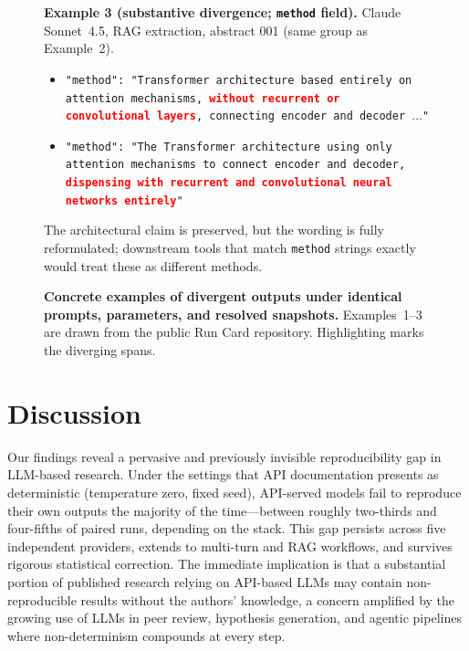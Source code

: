 \documentclass[sn-nature]{sn-jnl}
\begin{document}
\begin{figure}[t]
{\begin{minipage}{0.94\textwidth}
\medskip
\noindent\textbf{Example 3 (substantive divergence; \texttt{method} field).}
Claude Sonnet~4.5, RAG extraction, abstract 001 (same group as Example~2).
\begin{itemize}
\item[Run~A:] \texttt{"method": "Transformer architecture based entirely on attention mechanisms, \textcolor{red}{\textbf{without recurrent or convolutional layers}}, connecting encoder and decoder $\ldots$"}
\item[Run~B:] \texttt{"method": "The Transformer architecture using only attention mechanisms to connect encoder and decoder, \textcolor{red}{\textbf{dispensing with recurrent and convolutional neural networks entirely}}"}
\end{itemize}
The architectural claim is preserved, but the wording is fully reformulated; downstream tools that match \texttt{method} strings exactly would treat these as different methods.
\end{minipage}}
\caption{\textbf{Concrete examples of divergent outputs under identical prompts, parameters, and resolved snapshots.}
Examples~1--3 are drawn from the public Run Card repository.
Highlighting marks the diverging spans.}\label{box:examples}
\end{figure}


\section{Discussion}\label{sec:discussion}

Our findings reveal a pervasive and previously invisible reproducibility gap in LLM-based research.
Under the settings that API documentation presents as deterministic (temperature zero, fixed seed), API-served models fail to reproduce their own outputs the majority of the time---between roughly two-thirds and four-fifths of paired runs, depending on the stack.
This gap persists across five independent providers, extends to multi-turn and RAG workflows, and survives rigorous statistical correction.
The immediate implication is that a substantial portion of published research relying on API-based LLMs may contain non-reproducible results without the authors' knowledge, a concern amplified by the growing use of LLMs in peer review\cite{thakkar2026llm}, hypothesis generation\cite{xin2025agentic}, and agentic pipelines where non-determinism compounds at every step.
\end{document}
